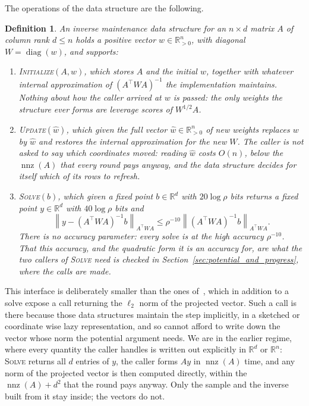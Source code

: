 \documentclass[11pt]{article}
\newtheorem{definition}{Definition}[section]
\newcommand{\R}{\mathbb R}
\newcommand{\diag}{\operatorname{diag}}
\newcommand{\nnz}{\operatorname{nnz}}
\newcommand{\what}{\widehat{w}}
\begin{document}
The operations of the data structure are the following.

\begin{definition}
\label{def:operations}
An \emph{inverse maintenance data structure} for an $n \times d$ matrix
$A$ of column rank
$d \le n$ holds a positive vector
$w \in \R^{n}_{>0}$, with diagonal
$W = \diag(w)$, and supports:
\begin{enumerate}
\item \label{itm:operations:1} \textsc{Initialize}$(A, w)$, which stores
  $A$ and the initial
  $w$, together with whatever internal approximation of
  $(A^\top W A)^{-1}$ the implementation maintains.
  Nothing about how the caller arrived at $w$ is passed: the only weights the
  structure ever forms are leverage scores of $W^{1/2} A$.
\item \label{itm:operations:2} \textsc{Update}$(\what)$, which given the full
  vector $\what \in \R^{n}_{>0}$ of new weights replaces
  $w$ by
  $\what$ and restores the internal approximation for the new
  $W$.
  The caller is not asked to say which coordinates moved: reading $\what$ costs
  $O(n)$, below the
  $\nnz(A)$ that every round pays anyway, and the data structure decides for
  itself which of its rows to refresh.
\item \label{itm:operations:3} \textsc{Solve}$(b)$, which given a fixed point
  $b \in \R^{d}$ with
  $20 \log \rho$ bits returns a fixed point
  $y \in \R^{d}$ with
  $40 \log \rho$ bits and
\begin{equation}
\label{eq:solve_guarantee}
\left\| y - (A^\top W A)^{-1} b \right\|_{A^\top W A}
\le
\rho^{-10} \left\| (A^\top W A)^{-1} b \right\|_{A^\top W A} .
\end{equation}
There is no accuracy parameter: every solve is at the high accuracy
$\rho^{-10}$.
That this accuracy, and the quadratic form it is an accuracy for, are what the
two callers of \textsc{Solve} need is checked in
Section~\ref{sec:potential_and_progress}, where the calls are made.
\end{enumerate}
\end{definition}

This interface is deliberately smaller than the ones
of~\cite{BLLSSSW21}, which in addition to a
solve expose a call returning the $\ell_2$ norm of the projected vector.
Such a call is there because those data structures maintain the step implicitly,
in a sketched or coordinate wise lazy representation, and so cannot afford to
write down the vector whose norm the potential argument needs.
We are in the earlier regime, where every quantity the caller handles is written
out explicitly in $\R^{d}$ or
$\R^{n}$: \textsc{Solve} returns all
$d$ entries of
$y$, the caller forms
$A y$ in
$\nnz(A)$ time, and any norm of the projected vector is then computed directly,
within the $\nnz(A) + d^2$ that the round pays anyway.
Only the sample and the inverse built from it stay inside; the vectors do not.
\end{document}
